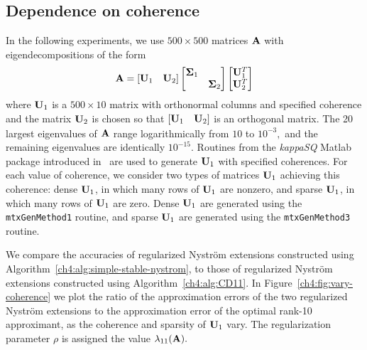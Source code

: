 \subsection{Dependence on coherence}
In the following experiments, we use $500 \times 500$ matrices $\mathbf{A}$ with
eigendecompositions of the form
\begin{equation}
\mathbf{A} = [\begin{matrix} \mathbf{U}_1 & \mathbf{U}_2 \end{matrix}] 
 \left[ \begin{matrix} \mathbf{\Sigma}_1 & \\ & \mathbf{\Sigma}_2 \end{matrix} \right]
 \left[ \begin{matrix} \mathbf{U}_1^T \\ \mathbf{U}_2^T \end{matrix} \right]
 \label{ch4:eqn:coherenceA}
\end{equation}
where $\mathbf{U}_1$ is a $500 \times 10$ matrix with orthonormal columns and
specified coherence and the matrix $\mathbf{U}_2$ is chosen so that
$[\begin{matrix} \mathbf{U}_1 & \mathbf{U}_2 \end{matrix}]$ is an orthogonal matrix.
The 20 largest eigenvalues of $\mathbf{A}$ range logarithmically from $10$ to
$10^{-3},$ and the remaining eigenvalues are identically $10^{-15}.$ Routines
from the \textit{kappaSQ} Matlab package introduced in~\cite{IW12} are used to
generate $\mathbf{U}_1$ with specified coherences. For each value of coherence, we
consider two types of matrices $\mathbf{U}_1$ achieving this coherence: dense $\mathbf{U}_1$,
in which many rows of $\mathbf{U}_1$ are nonzero, and sparse $\mathbf{U}_1$, in which
many rows of $\mathbf{U}_1$ are zero. Dense $\mathbf{U}_1$ are generated using the
\texttt{mtxGenMethod1} routine, and sparse $\mathbf{U}_1$ are generated using the
\texttt{mtxGenMethod3} routine.

We compare the accuracies of regularized Nystr\"om extensions constructed using
Algorithm~\ref{ch4:alg:simple-stable-nystrom},
 to those of regularized Nystr\"om extensions constructed using
Algorithm~\ref{ch4:alg:CD11}. In Figure~\ref{ch4:fig:vary-coherence} we plot the ratio
of the approximation errors of the two regularized Nystr\"om extensions to the approximation
error of the optimal rank-10 approximant, as the coherence and sparsity of
$\mathbf{U}_1$ vary.
The regularization parameter $\rho$ is assigned the value
$\lambda_{11}(\mathbf{A}).$

